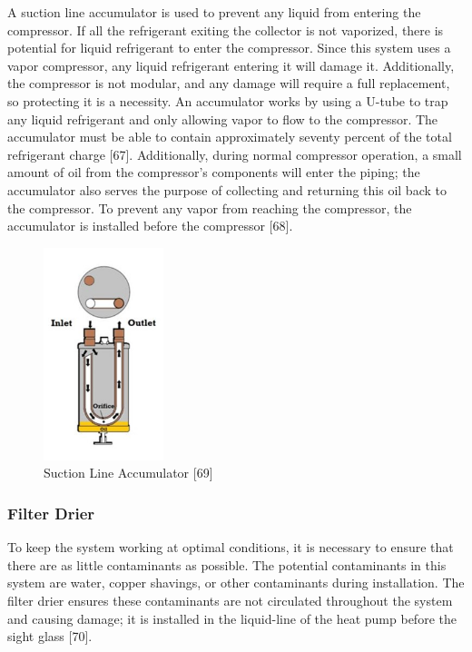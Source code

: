 A suction line accumulator is used to prevent any liquid from entering the compressor. If all the refrigerant exiting the collector is not vaporized, there is potential for liquid refrigerant to enter the compressor. Since this system uses a vapor compressor, any liquid refrigerant entering it will damage it. Additionally, the compressor is not modular, and any damage will require a full replacement, so protecting it is a necessity. An accumulator works by using a U-tube to trap any liquid refrigerant and only allowing vapor to flow to the compressor. The accumulator must be able to contain approximately seventy percent of the total refrigerant charge [67]. Additionally, during normal compressor operation, a small amount of oil from the compressor’s components will enter the piping; the accumulator also serves the purpose of collecting and returning this oil back to the compressor. To prevent any vapor from reaching the compressor, the accumulator is installed before the compressor [68].

\medskip
\begin{figure}[H]
    \centering
    \includegraphics[width=3.5cm]{images/accumulator.jpg}
    \caption{Suction Line Accumulator [69]}
\end{figure}

\subsubsection{Filter Drier}

To keep the system working at optimal conditions, it is necessary to ensure that there are as little contaminants as possible. The potential contaminants in this system are water, copper shavings, or other contaminants during installation. The filter drier ensures these contaminants are not circulated throughout the system and causing damage; it is installed in the liquid-line of the heat pump before the sight glass [70].

